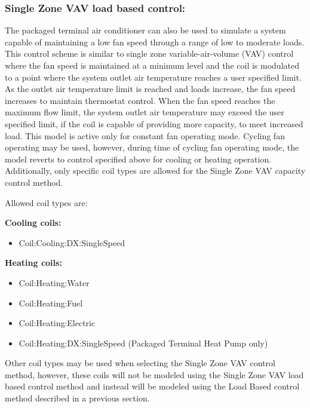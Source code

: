 \subsubsection{Single Zone VAV load based control:}\label{single-zone-vav-load-based-control}

The packaged terminal air conditioner can also be used to simulate a system capable of maintaining a low fan speed through a range of low to moderate loads. This control scheme is similar to single zone variable-air-volume (VAV) control where the fan speed is maintained at a minimum level and the coil is modulated to a point where the system outlet air temperature reaches a user specified limit. As the outlet air temperature limit is reached and loads increase, the fan speed increases to maintain thermostat control. When the fan speed reaches the maximum flow limit, the system outlet air temperature may exceed the user specified limit, if the coil is capable of providing more capacity, to meet increased load. This model is active only for constant fan operating mode. Cycling fan operating may be used, however, during time of cycling fan operating mode, the model reverts to control specified above for cooling or heating operation. Additionally, only specific coil types are allowed for the Single Zone VAV capacity control method. 

Allowed coil types are:

\textbf{Cooling coils:}
\begin{itemize}
\item Coil:Cooling:DX:SingleSpeed
\end{itemize}

\textbf{Heating coils:}
\begin{itemize}
\item Coil:Heating:Water
\item Coil:Heating:Fuel
\item Coil:Heating:Electric
\item Coil:Heating:DX:SingleSpeed (Packaged Terminal Heat Pump only)
\end{itemize}

Other coil types may be used when selecting the Single Zone VAV control method, however, these coils will not be modeled using the Single Zone VAV load based control method and instead will be modeled using the Load Based control method described in a previous section.

